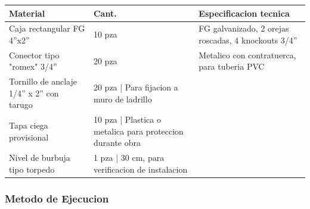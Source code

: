 \begin{longtable}{L{5.0cm} L{2.0cm} L{7.5cm}}
\toprule
\textbf{Material} & \textbf{Cant.} & \textbf{Especificacion tecnica} \\
\midrule
Caja rectangular FG 4''x2'' & 10 pza & FG galvanizado, 2 orejas roscadas, 4 knockouts 3/4'' \\
Conector tipo "romex" 3/4'' & 20 pza & Metalico con contratuerca, para tuberia PVC \\
Tornillo de anclaje 1/4'' x 2'' con tarugo & 20 pza | Para fijacion a muro de ladrillo \\
Tapa ciega provisional & 10 pza | Plastica o metalica para proteccion durante obra \\
Nivel de burbuja tipo torpedo & 1 pza | 30 cm, para verificacion de instalacion \\
\bottomrule
\end{longtable}

\subsubsection{Metodo de Ejecucion}


